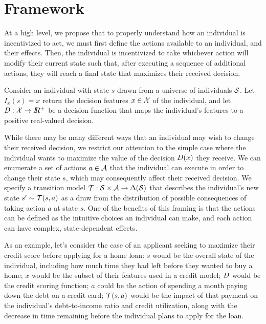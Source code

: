 \section{Framework}
\label{sec:framework}
At a high level, we propose that to properly understand how an individual is incentivized to act, we must first define the actions available to an individual, and their effects. Then, the individual is incentivized to take whichever action will modify their current state such that, after executing a sequence of additional actions, they will reach a final state that maximizes their received decision.

Consider an individual with state $s$ drawn from a universe of individuals $\mathcal{S}$. Let $I_x(s) = x$ return the decision features $x \in \mathcal{X}$ of the individual, and let $D: \mathcal{X} \rightarrow I\!\!R^+$ be a decision function that maps the individual's features to a positive real-valued decision.

While there may be many different ways that an individual may wish to change their received decision, we restrict our attention to the simple case where the individual wants to maximize the value of the decision $D(x)$ they receive. We can enumerate a set of actions $a \in \mathcal{A}$ that the individual can execute in order to change their state $s$, which may consequently affect their received decision.
We specify a transition model $\mathcal{T}: \mathcal{S} \times \mathcal{A} \rightarrow \Delta(\mathcal{S})$ that describes the individual's new state $s' \sim \mathcal{T}(s, a)$ as a draw from the distribution of possible consequences of taking action $a$ at state $s$. One of the benefits of this framing is that the actions can be defined as the intuitive choices an individual can make, and each action can have complex, state-dependent effects. 

As an example, let's consider the case of an applicant seeking to maximize their credit score before applying for a home loan: $s$ would be the overall state of the individual, including how much time they had left before they wanted to buy a home; $x$ would be the subset of their features used in a credit model; $D$ would be the credit scoring function; $a$ could be the action of spending a month paying down the debt on a credit card; $\mathcal{T}(s, a)$ would be the impact of that payment on the individual's debt-to-income ratio and credit utilization, along with the decrease in time remaining before the individual plans to apply for the loan.

